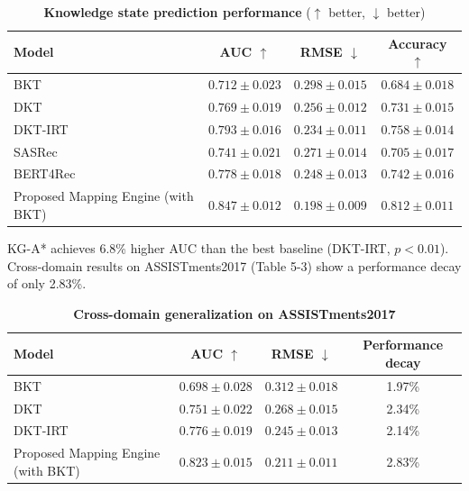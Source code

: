 \documentclass{ieeeaccess}
\begin{document}
\begin{table}[t]
\setlength{\belowcaptionskip}{0pt}
\caption{\textbf{Knowledge state prediction performance} ($\uparrow$ better, $\downarrow$ better)}
\label{table5-2}
\setlength{\tabcolsep}{2pt}
\small
\begin{tabularx}{\linewidth}{|>{\raggedright\arraybackslash}X|C|C|C|}
\hline
\textbf{Model} & \textbf{AUC $\uparrow$} & \textbf{RMSE $\downarrow$} & \textbf{Accuracy $\uparrow$} \\
\hline
BKT & $0.712 \pm 0.023$ & $0.298 \pm 0.015$ & $0.684 \pm 0.018$ \\
DKT & $0.769 \pm 0.019$ & $0.256 \pm 0.012$ & $0.731 \pm 0.015$ \\
DKT-IRT & $0.793 \pm 0.016$ & $0.234 \pm 0.011$ & $0.758 \pm 0.014$ \\
SASRec & $0.741 \pm 0.021$ & $0.271 \pm 0.014$ & $0.705 \pm 0.017$ \\
BERT4Rec & $0.778 \pm 0.018$ & $0.248 \pm 0.013$ & $0.742 \pm 0.016$ \\
Proposed Mapping Engine (with BKT) & $0.847 \pm 0.012$ & $0.198 \pm 0.009$ & $0.812 \pm 0.011$ \\
\hline
\end{tabularx}
\end{table}

KG-A* achieves 6.8\% higher AUC than the best baseline (DKT-IRT, $p<0.01$). Cross-domain results on ASSISTments2017 (Table 5-3) show a performance decay of only 2.83\%.

\begin{table}[t]
\setlength{\belowcaptionskip}{0pt}
\caption{\textbf{Cross-domain generalization on ASSISTments2017}}
\label{table5-3}
\setlength{\tabcolsep}{2pt}          %
\small                               %
\begin{tabularx}{\linewidth}{|>{\raggedright\arraybackslash}X|C|C|C|}
\hline
\textbf{Model} & \textbf{AUC $\uparrow$} & \textbf{RMSE $\downarrow$} & \textbf{Performance decay} \\
\hline
BKT & $0.698 \pm 0.028$ & $0.312 \pm 0.018$ & 1.97\% \\
DKT & $0.751 \pm 0.022$ & $0.268 \pm 0.015$ & 2.34\% \\
DKT-IRT & $0.776 \pm 0.019$ & $0.245 \pm 0.013$ & 2.14\% \\
Proposed Mapping Engine (with BKT) & $0.823 \pm 0.015$ & $0.211 \pm 0.011$ & 2.83\% \\
\hline
\end{tabularx}
\end{table}
\end{document}

